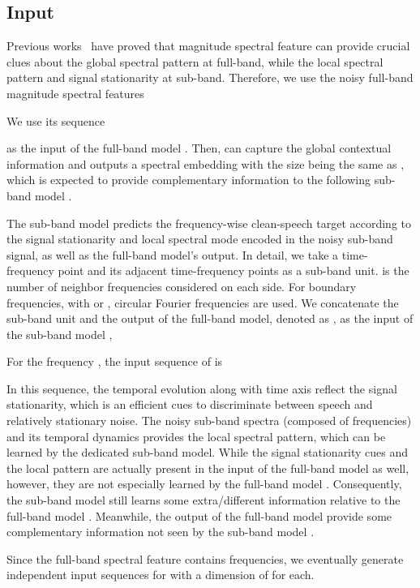 \documentclass{article}
\begin{document}
\subsection{Input}
Previous works~\cite{se_overview,regression_approch,li_narrow-band_2019,sub_dns_xiaofeili} have proved that magnitude spectral feature can provide crucial clues about the global spectral pattern at full-band, while the local spectral pattern and signal stationarity at sub-band.
Therefore, we use the noisy full-band magnitude spectral features
 
We use its sequence

as the input of the full-band model .
Then,  can capture the global contextual information and outputs a spectral embedding with the size being the same as , which is expected to provide complementary information to the following sub-band model .

The sub-band model  predicts the frequency-wise clean-speech target according to the signal stationarity and local spectral mode encoded in the noisy sub-band signal, as well as the full-band model's output.
In detail, we take a time-frequency point  and its adjacent  time-frequency points as a sub-band unit.
 is the number of neighbor frequencies considered on each side. For boundary frequencies, with  or , circular Fourier frequencies are used.
We concatenate the sub-band unit and the output of the full-band model, denoted as , as the input of the sub-band model ,

For the frequency , the input sequence of  is

In this sequence, the temporal evolution along with time axis reflect the signal stationarity, which is an efficient cues to discriminate between speech and relatively stationary noise.
The noisy sub-band spectra (composed of  frequencies) and its temporal dynamics provides the local spectral pattern, which can be learned by the dedicated sub-band model. While the signal stationarity cues and the local pattern are actually present in the input of the full-band model  as well, however, they are not especially learned by the full-band model .  Consequently, the sub-band model  still learns some extra/different information relative to the full-band model .  Meanwhile, the output of the full-band model  provide some complementary information not seen by the sub-band model . 

Since the full-band spectral feature  contains  frequencies, we eventually generate  independent input sequences for  with a dimension of  for each.
\end{document}
